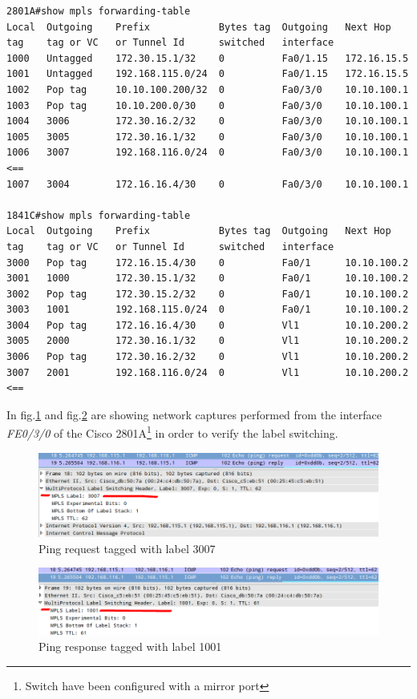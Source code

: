 \documentclass{llncs}
\begin{document}
\lstset{language=sh, caption=MPLS forwarding table of Cisco 2801A and 1841C, basicstyle=\ttfamily\scriptsize , breaklines=true}
\begin{lstlisting}
2801A#show mpls forwarding-table 
Local  Outgoing    Prefix            Bytes tag  Outgoing   Next Hop    
tag    tag or VC   or Tunnel Id      switched   interface              
1000   Untagged    172.30.15.1/32    0          Fa0/1.15   172.16.15.5  
1001   Untagged    192.168.115.0/24  0          Fa0/1.15   172.16.15.5  
1002   Pop tag     10.10.100.200/32  0          Fa0/3/0    10.10.100.1  
1003   Pop tag     10.10.200.0/30    0          Fa0/3/0    10.10.100.1  
1004   3006        172.30.16.2/32    0          Fa0/3/0    10.10.100.1  
1005   3005        172.30.16.1/32    0          Fa0/3/0    10.10.100.1  
1006   3007        192.168.116.0/24  0          Fa0/3/0    10.10.100.1  <==
1007   3004        172.16.16.4/30    0          Fa0/3/0    10.10.100.1  

1841C#show mpls forwarding-table 
Local  Outgoing    Prefix            Bytes tag  Outgoing   Next Hop    
tag    tag or VC   or Tunnel Id      switched   interface              
3000   Pop tag     172.16.15.4/30    0          Fa0/1      10.10.100.2  
3001   1000        172.30.15.1/32    0          Fa0/1      10.10.100.2  
3002   Pop tag     172.30.15.2/32    0          Fa0/1      10.10.100.2  
3003   1001        192.168.115.0/24  0          Fa0/1      10.10.100.2  
3004   Pop tag     172.16.16.4/30    0          Vl1        10.10.200.2  
3005   2000        172.30.16.1/32    0          Vl1        10.10.200.2  
3006   Pop tag     172.30.16.2/32    0          Vl1        10.10.200.2  
3007   2001        192.168.116.0/24  0          Vl1        10.10.200.2  <==
\end{lstlisting}

In fig.\ref{fig:mpl1_ping1} and fig.\ref{fig:mpl1_ping2} are showing network captures performed from the interface \emph{FE0/3/0} of the Cisco 2801A\footnote{Switch have been configured with a mirror port} in order to verify the label switching.

\begin{figure}
\centering
\includegraphics[width=1.0\textwidth]{../e3/ping.png}
\caption{Ping request tagged with label 3007}
\label{fig:mpl1_ping1}
\end{figure}
\begin{figure}
\centering
\includegraphics[width=1.0\textwidth]{../e3/pong.png}
\caption{Ping response tagged with label 1001}
\label{fig:mpl1_ping2}
\end{figure}
\end{document}
